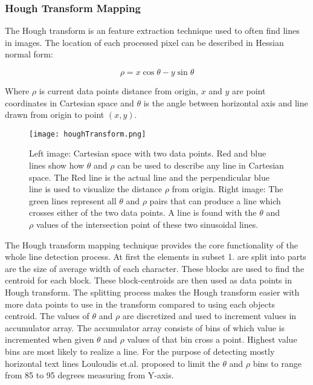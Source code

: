 \documentclass{article}
\begin{document}
          \subsubsection{Hough Transform Mapping}
          \label{sec:houghtransformmapping}
            The Hough transform is an feature extraction technique used to often find lines in images. The location of each processed pixel can be described in Hessian normal form:

            \begin{equation}
              \rho = x \cos \theta - y \sin \theta
            \end{equation}

            Where $\rho$ is current data points distance from origin, $x$ and $y$ are point coordinates in Cartesian space and $\theta$ is the angle between horizontal axis and line drawn from origin to point $(x,y)$.

            \begin{figure}[!ht]
              \centering
              \texttt{[image: houghTransform.png]}
              \caption{ Left image: Cartesian space with two data points. Red and blue lines show how $\theta$ and $\rho$ can be used to describe any line in Cartesian space. The Red line is the actual line and the perpendicular blue line is used to visualize the distance $\rho$ from origin. Right image: The green lines represent all $\theta$ and $\rho$ pairs that can produce a line which crosses either of the two data points. A line is found with the $\theta$ and $\rho$ values of the intersection point of these two sinusoidal lines. \label{fig:houghtransform}}
            \end{figure}

            The Hough transform mapping technique provides the core functionality of the whole line detection process. At first the elements in subset 1. are split into parts are the size of average width of each character. These blocks are used to find the centroid for each block. These block-centroids are then used as data points in Hough transform. The splitting process makes the Hough transform easier with more data points to use in the transform compared to using each objects centroid. The values of $\theta$ and $\rho$ are discretized and used to increment values in accumulator array. The accumulator array consists of bins of which value is incremented when given $\theta$ and $\rho$ values of that bin cross a point. Highest value bins are most likely to realize a line. For the purpose of detecting mostly horizontal text lines Louloudis et.al. proposed to limit the $\theta$ and $\rho$ bins to range from 85 to 95 degrees measuring from Y-axis.
\end{document}
